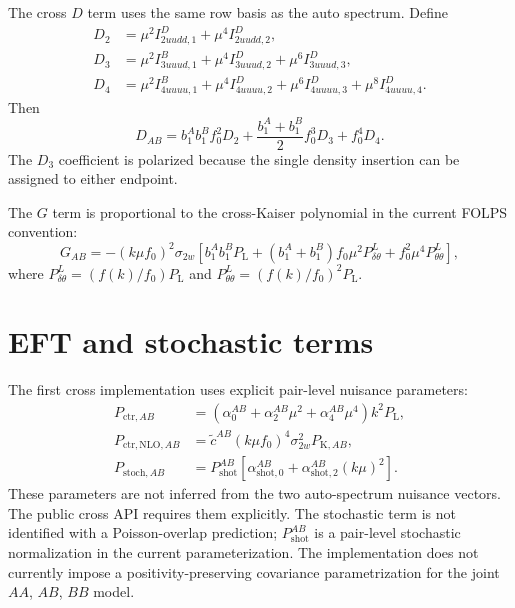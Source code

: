 \documentclass[11pt]{article}
\newcommand{\PL}{P_{\mathrm L}}
\begin{document}
The cross $D$ term uses the same row basis as the auto spectrum.  Define
\begin{align}
D_2 &=
\mu^2 I^D_{2uudd,1}
+\mu^4 I^D_{2uudd,2},
\nonumber\\
D_3 &=
\mu^2 I^B_{3uuud,1}
+\mu^4 I^D_{3uuud,2}
+\mu^6 I^D_{3uuud,3},
\nonumber\\
D_4 &=
\mu^2 I^B_{4uuuu,1}
+\mu^4 I^D_{4uuuu,2}
+\mu^6 I^D_{4uuuu,3}
+\mu^8 I^D_{4uuuu,4}.
\end{align}
Then
\begin{equation}
D_{AB}
=
b_1^A b_1^B f_0^2D_2
+
\frac{b_1^A+b_1^B}{2}f_0^3D_3
+
f_0^4D_4 .
\label{eq:D-cross}
\end{equation}
The $D_3$ coefficient is polarized because the single density insertion can be
assigned to either endpoint.

The $G$ term is proportional to the cross-Kaiser polynomial in the current
FOLPS convention:
\begin{equation}
G_{AB}
=
-(k\mu f_0)^2\sigma_{2w}
\left[
b_1^A b_1^B \PL
+
(b_1^A+b_1^B)f_0\mu^2P_{\delta\theta}^{L}
+
f_0^2\mu^4P_{\theta\theta}^{L}
\right],
\label{eq:G-cross}
\end{equation}
where
$P_{\delta\theta}^{L}=(f(k)/f_0)\PL$ and
$P_{\theta\theta}^{L}=(f(k)/f_0)^2\PL$.

\section{EFT and stochastic terms}

The first cross implementation uses explicit pair-level nuisance parameters:
\begin{align}
P_{\mathrm{ctr},AB}
&=
(\alpha_0^{AB}
+\alpha_2^{AB}\mu^2
+\alpha_4^{AB}\mu^4)
k^2\PL,
\label{eq:ctr}
\\
P_{\mathrm{ctr,NLO},AB}
&=
\widetilde c^{AB}
(k\mu f_0)^4
\sigma_{2w}^2
P_{\mathrm K,AB},
\label{eq:ctr-nlo}
\\
P_{\mathrm{stoch},AB}
&=
P_{\mathrm{shot}}^{AB}
\left[
\alpha_{\mathrm{shot},0}^{AB}
+
\alpha_{\mathrm{shot},2}^{AB}(k\mu)^2
\right].
\label{eq:stoch}
\end{align}
These parameters are not inferred from the two auto-spectrum nuisance vectors.
The public cross API requires them explicitly.  The stochastic term is not
identified with a Poisson-overlap prediction; $P_{\mathrm{shot}}^{AB}$ is a
pair-level stochastic normalization in the current parameterization.  The
implementation does not currently impose a positivity-preserving covariance
parametrization for the joint $AA$, $AB$, $BB$ model.
\end{document}
